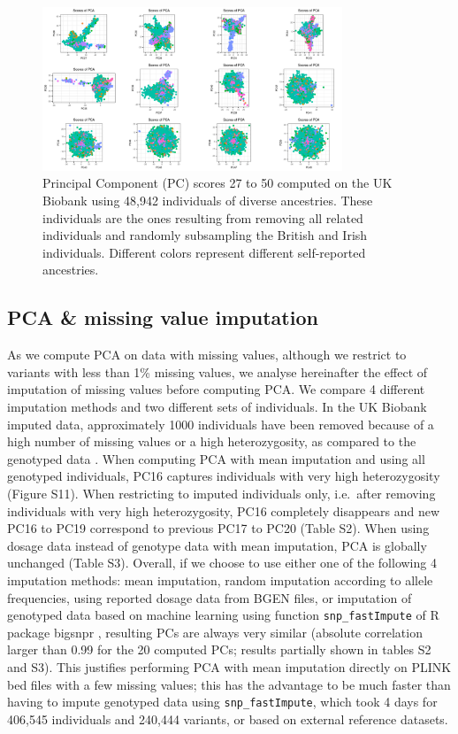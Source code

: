 \documentclass{bioinfo}
\begin{document}
\begin{figure}[htb]
\centerline{\includegraphics[width=0.8\textwidth]{UKBB-scores-restricted.png}}
\caption{Principal Component (PC) scores 27 to 50 computed on the UK Biobank using 48,942 individuals of diverse ancestries. These individuals are the ones resulting from removing all related individuals and randomly subsampling the British and Irish individuals. Different colors represent different self-reported ancestries.
\label{fig:UKBB-scores2}}
\end{figure}

\subsection{PCA \& missing value imputation}

As we compute PCA on data with missing values, although we restrict to variants with less than 1\% missing values, we analyse hereinafter the effect of imputation of missing values before computing PCA.
We compare 4 different imputation methods and two different sets of individuals.
In the UK Biobank imputed data, approximately 1000 individuals have been removed because of a high number of missing values or a high heterozygosity, as compared to the genotyped data \cite[]{bycroft2017genome}.
When computing PCA with mean imputation and using all genotyped individuals, PC16 captures individuals with very high heterozygosity (Figure S11). When restricting to imputed individuals only, i.e.\ after removing individuals with very high heterozygosity, PC16 completely disappears and new PC16 to PC19 correspond to previous PC17 to PC20 (Table S2).
When using dosage data instead of genotype data with mean imputation, PCA is globally unchanged (Table S3). 
Overall, if we choose to use either one of the following 4 imputation methods: mean imputation, random imputation according to allele frequencies, using reported dosage data from BGEN files, or imputation of genotyped data based on machine learning using function \texttt{snp\_fastImpute} of R package bigsnpr \cite[]{prive2017efficient}, resulting PCs are always very similar (absolute correlation larger than 0.99 for the 20 computed PCs; results partially shown in tables S2 and S3). 
This justifies performing PCA with mean imputation directly on PLINK bed files with a few missing values; this has the advantage to be much faster than having to impute genotyped data using \texttt{snp\_fastImpute}, which took 4 days for 406,545 individuals and 240,444 variants, or based on external reference datasets.
\end{document}
